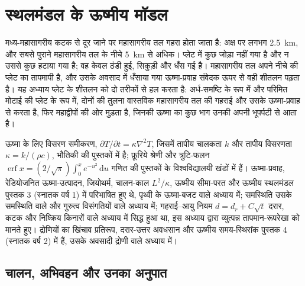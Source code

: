 \chapter{स्थलमंडल के ऊष्मीय मॉडल}\label{ch:b3:lithosphere-thermal-models}

मध्य-महासागरीय कटक से दूर जाने पर महासागरीय तल गहरा होता जाता है: अक्ष पर लगभग
\qty{2.5}{km}, और सबसे पुराने महासागरीय तल के नीचे \qty{5}{km} से अधिक।
प्लेट में कुछ जोड़ा नहीं गया है और न उससे कुछ हटाया गया है; वह केवल
ठंडी हुई, सिकुड़ी और धँस गई है। महासागरीय तल अपने नीचे की प्लेट का तापमापी है,
और उसके अवसाद में धँसाया गया ऊष्मा-प्रवाह संवेदक ऊपर से वही शीतलन पढ़ता है।
यह अध्याय प्लेट के शीतलन को दो तरीकों से हल करता है: अर्ध-समष्टि के रूप में
और परिमित मोटाई की प्लेट के रूप में, दोनों की तुलना वास्तविक महासागरीय तल की गहराई
और उसके ऊष्मा-प्रवाह से करता है, फिर महाद्वीपों की ओर मुड़ता है,
जिनकी ऊष्मा का कुछ भाग उनकी अपनी भूपर्पटी से आता है।

\begin{recall}
ऊष्मा के लिए विसरण समीकरण, $\partial T/\partial t = \kappa\nabla^2T$,
जिसमें तापीय चालकता $k$ और तापीय विसरणता $\kappa =
k/(\rho c)$, भौतिकी की पुस्तकों में है; फ़ूरिये श्रेणी और त्रुटि-फलन
$\operatorname{erf}x = (2/\sqrt\pi)\int_0^xe^{-u^2}\,\mathrm du$ गणित की पुस्तकों के
विश्वविद्यालयी खंडों में हैं। ऊष्मा-प्रवाह, रेडियोजनित ऊष्मा-उत्पादन,
जियोथर्म, चालन-काल $L^2/\kappa$, ऊष्मीय
सीमा-परत और ऊष्मीय स्थलमंडल पुस्तक 3 (स्नातक वर्ष 1) में परिभाषित हुए थे,
पृथ्वी के ऊष्मा-बजट वाले अध्याय में; समस्थिति उसके समस्थिति वाले
और गुरुत्व विसंगतियों वाले अध्याय में; गहराई–आयु नियम $d = d_r + C\sqrt t$
दरार, कटक और निष्क्रिय किनारों वाले अध्याय में सिद्ध हुआ था, इस अध्याय द्वारा
व्युत्पन्न तापमान-रूपरेखा को मानते हुए। द्रोणियों का खिंचाव प्रतिरूप, दरार-उत्तर
अवधसान और ऊष्मीय समय-स्थिरांक पुस्तक 4 (स्नातक वर्ष 2) में हैं, उसके
अवसादी द्रोणी वाले अध्याय में।
\end{recall}

\section{चालन, अभिवहन और उनका अनुपात}

